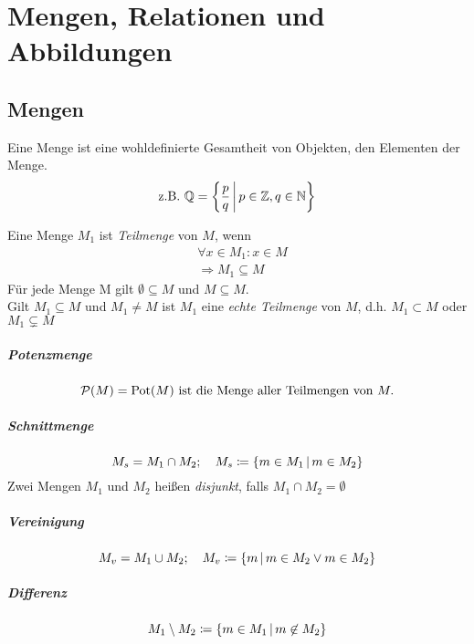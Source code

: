 \chapter{Mengen, Relationen und Abbildungen}

\section{Mengen}
Eine Menge ist eine wohldefinierte Gesamtheit von Objekten, den Elementen der Menge.
\begin{equation*}
  \text{z.B. }\mathbb{Q}=\left\{ \frac{p}{q} \,\middle|\, p\in\mathbb{Z}, q\in\mathbb{N} \right\}
\end{equation*}

Eine Menge $M_1$ ist \emph{Teilmenge} von $M$, wenn
\begin{align*}
  &\forall x\in M_1 : x\in M\\
  &\Rightarrow M_1 \subseteq M
\end{align*}
Für jede Menge M gilt $\emptyset \subseteq M$ und $M\subseteq M$.\\
Gilt $M_1\subseteq M$ und $M_1\neq M$ ist $M_1$ eine \emph{echte Teilmenge} von $M$, d.h. $M_1 \subset M$ oder $M_1\subsetneq M$

\paragraph{Potenzmenge}
\begin{equation*}
  \mathcal{P}(M)=\mathrm{Pot}(M) \text{ ist die Menge aller Teilmengen von } M.
\end{equation*}
\paragraph{Schnittmenge}
\begin{equation*}
  M_s = M_1 \cap M_2; \quad M_s \coloneqq \left\{ m\in M_1 \,\middle|\, m\in M_2 \right\}
\end{equation*}
Zwei Mengen $M_1$ und $M_2$ heißen \emph{disjunkt}, falls $M_1\cap M_2 = \emptyset$
\paragraph{Vereinigung}
\begin{equation*}
  M_v = M_1 \cup M_2; \quad M_v \coloneqq \left\{ m \,\middle|\, m\in M_2 \vee m\in M_2 \right\}
\end{equation*}
\paragraph{Differenz}
\begin{equation*}
  M_1\setminus M_2 \coloneqq \left\{ m\in M_1 \,\middle|\, m\not\in M_2 \right\}
\end{equation*}
